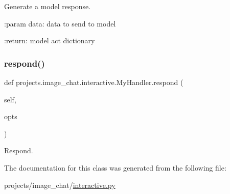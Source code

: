 \begin{DoxyVerb}Generate a model response.

:param data:
    data to send to model

:return:
    model act dictionary
\end{DoxyVerb}
 \mbox{\label{classprojects_1_1image__chat_1_1interactive_1_1MyHandler_a8c651ac02abcedfd49fd7b89128ee737}} 
\subsubsection{\texorpdfstring{respond()}{respond()}}
{\footnotesize\ttfamily def projects.\+image\+\_\+chat.\+interactive.\+My\+Handler.\+respond (\begin{DoxyParamCaption}\item[{}]{self,  }\item[{}]{opts }\end{DoxyParamCaption})}

\begin{DoxyVerb}Respond.
\end{DoxyVerb}
 

The documentation for this class was generated from the following file\+:\begin{DoxyCompactItemize}
\item 
projects/image\+\_\+chat/\hyperlink{projects_2image__chat_2interactive_8py}{interactive.\+py}\end{DoxyCompactItemize}
